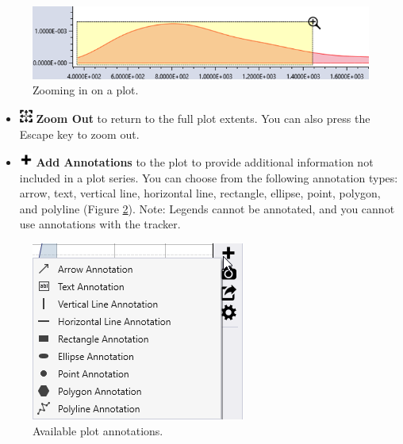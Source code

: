 \documentclass[
]{book}
\begin{document}
\begin{figure}

{\centering \includegraphics{images/figure40} 

}

\caption{Zooming in on a plot.}\label{fig:figure-40}
\end{figure}

\begin{itemize}
\item
  \includegraphics{images/zoomout.png} \textbf{Zoom Out} to return to the full plot extents. You can also press the Escape key to zoom out.
\item
  \includegraphics{images/annotations.png} \textbf{Add Annotations} to the plot to provide additional information not included in a plot series. You can choose from the following annotation types: arrow, text, vertical line, horizontal line, rectangle, ellipse, point, polygon, and polyline (Figure \ref{fig:figure-41}). Note: Legends cannot be annotated, and you cannot use annotations with the tracker.
\end{itemize}

\begin{figure}

{\centering \includegraphics{images/figure41} 

}

\caption{Available plot annotations.}\label{fig:figure-41}
\end{figure}
\end{document}
